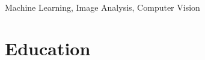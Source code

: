 \documentclass[line,margin]{res}
\begin{document}
\begin{resume}

%
%
\section{}       

Machine Learning, Image Analysis, Computer Vision %



\section{\sc Education}
\smallskip


\end{resume}
\end{document}

